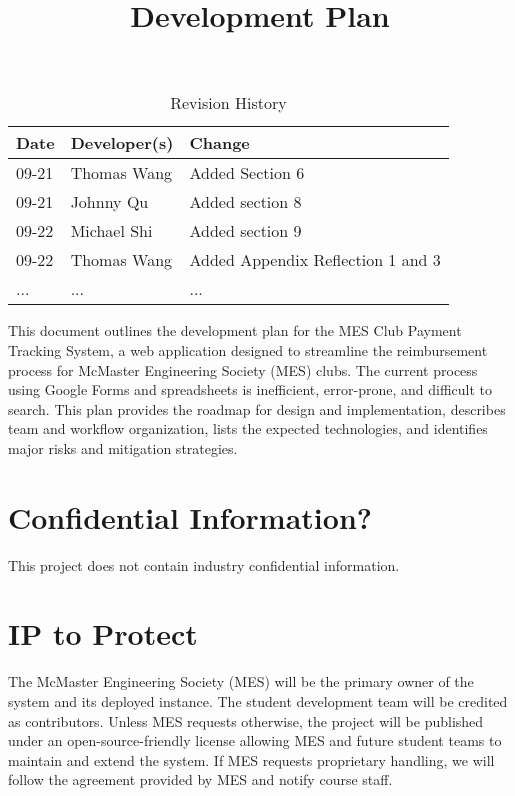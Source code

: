\documentclass{article}
\title{Development Plan\\\progname}
\author{\authname}
\date{}
\begin{document}
\maketitle

\begin{table}[hp]
\caption{Revision History} \label{TblRevisionHistory}
\begin{tabularx}{\textwidth}{llX}
\toprule
\textbf{Date} & \textbf{Developer(s)} & \textbf{Change}\\
\midrule
09-21 & Thomas Wang & Added Section 6\\
09-21 & Johnny Qu & Added section 8\\
09-22 & Michael Shi & Added section 9\\
09-22 & Thomas Wang & Added Appendix Reflection 1 and 3\\
... & ... & ...\\
\bottomrule
\end{tabularx}
\end{table}

\newpage{}

This document outlines the development plan for the MES Club Payment Tracking System, a web application designed to streamline the reimbursement process for McMaster Engineering Society (MES) clubs. The current process using Google Forms and spreadsheets is inefficient, error-prone, and difficult to search. This plan provides the roadmap for design and implementation, describes team and workflow organization, lists the expected technologies, and identifies major risks and mitigation strategies.


\section{Confidential Information?}

This project does not contain industry confidential information.

\section{IP to Protect}

The McMaster Engineering Society (MES) will be the primary owner of the system and its deployed instance. The student development team will be credited as contributors. Unless MES requests otherwise, the project will be published under an open-source-friendly license allowing MES and future student teams to maintain and extend the system. If MES requests proprietary handling, we will follow the agreement provided by MES and notify course staff.
\end{document}
